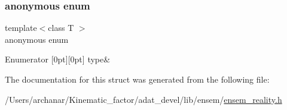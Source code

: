 \subsubsection{\texorpdfstring{anonymous enum}{anonymous enum}}
{\footnotesize\ttfamily template$<$class T $>$ \\
anonymous enum}

\begin{DoxyEnumFields}{Enumerator}
[0pt][0pt]{}\mbox{\label{structENSEM_1_1EnsbcIO_3_01RScalar_3_01T_01_4_01_4_a0f412d1ee6452284f67577ed452dc8d8a2700b782b422b58c4855d989a57b71c1}} 
type&\\
\hline

\end{DoxyEnumFields}


The documentation for this struct was generated from the following file\+:\begin{DoxyCompactItemize}
\item 
/\+Users/archanar/\+Kinematic\+\_\+factor/adat\+\_\+devel/lib/ensem/\mbox{\hyperlink{lib_2ensem_2ensem__reality_8h}{ensem\+\_\+reality.\+h}}\end{DoxyCompactItemize}
